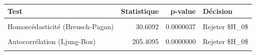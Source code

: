 \centering
\centering
\begin{tabular}[t]{lrrl}
\toprule
Test & Statistique & p-value & Décision\\
\midrule
\cellcolor{gray!10}{Centralité (Student)} & \cellcolor{gray!10}{0.0000} & \cellcolor{gray!10}{1.0000000} & \cellcolor{gray!10}{Ne pas rejeter \$H\_0\$}\\
Homoscédasticité (Breusch-Pagan) & 30.6092 & 0.0000037 & Rejeter \$H\_0\$\\
\cellcolor{gray!10}{Indépendance résidus / t (Pearson)} & \cellcolor{gray!10}{0.0000} & \cellcolor{gray!10}{1.0000000} & \cellcolor{gray!10}{Ne pas rejeter \$H\_0\$}\\
Autocorrélation (Ljung-Box) & 205.4095 & 0.0000000 & Rejeter \$H\_0\$\\
\cellcolor{gray!10}{Normalité (Shapiro-Wilk)} & \cellcolor{gray!10}{0.9873} & \cellcolor{gray!10}{0.4875865} & \cellcolor{gray!10}{Ne pas rejeter \$H\_0\$}\\
\bottomrule
\end{tabular}

